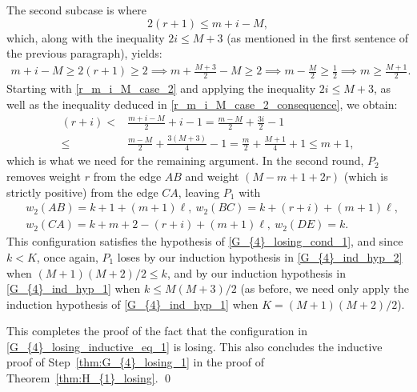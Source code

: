 \documentclass[11pt,reqno]{amsart}
\theoremstyle{definition}
\theoremstyle{definition}
\begin{document}
\begin{enumerate}
The second subcase is where 
\begin{equation}
2(r+1) \leqslant m+i-M,\label{r_m_i_M_case_2}
\end{equation}
which, along with the inequality $2i \leqslant M+3$ (as mentioned in the first sentence of the previous paragraph), yields:
\begin{align}
m+i-M \geqslant 2(r+1)\geqslant 2 \implies m+\frac{M+3}{2}-M \geqslant 2 \implies m-\frac{M}{2}\geqslant\frac{1}{2} \implies m\geqslant\frac{M+1}{2}.\label{r_m_i_M_case_2_consequence}
\end{align}
Starting with \eqref{r_m_i_M_case_2} and applying the inequality $2i \leqslant M+3$, as well as the inequality deduced in \eqref{r_m_i_M_case_2_consequence}, we obtain: 
\begin{align}
(r+i) <{}& \frac{m+i-M}{2}+i-1 = \frac{m-M}{2}+\frac{3i}{2}-1\nonumber\\
\leqslant{}& \frac{m-M}{2}+\frac{3(M+3)}{4}-1=\frac{m}{2}+\frac{M+1}{4}+1\leqslant m+1,\nonumber
\end{align} 
which is what we need for the remaining argument. In the second round, $P_{2}$ removes weight $r$ from the edge $AB$ and weight $(M-m+1+2r)$ (which is strictly positive) from the edge $CA$, leaving $P_{1}$ with
\begin{align}
{}&w_{2}(AB)=k+1+(m+1)\ell,\ w_{2}(BC)=k+(r+i)+(m+1)\ell,\nonumber\\
{}&w_{2}(CA)=k+m+2-(r+i)+(m+1)\ell,\ w_{2}(DE)=k.\nonumber
\end{align}
This configuration satisfies the hypothesis of \eqref{G_{4}_losing_cond_1}, and since $k < K$, once again, $P_{1}$ loses by our induction hypothesis in \eqref{G_{4}_ind_hyp_2} when $(M+1)(M+2)/2 \leqslant k$, and by our induction hypothesis in \eqref{G_{4}_ind_hyp_1} when $k \leqslant M(M+3)/2$ (as before, we need only apply the induction hypothesis of \eqref{G_{4}_ind_hyp_1} when $K=(M+1)(M+2)/2$).
\end{enumerate}

This completes the proof of the fact that the configuration in \eqref{G_{4}_losing_inductive_eq_1} is losing. This also concludes the inductive proof of Step~\eqref{thm:G_{4}_losing_1} in the proof of Theorem~\ref{thm:H_{1}_losing}. \qed
\end{document}
